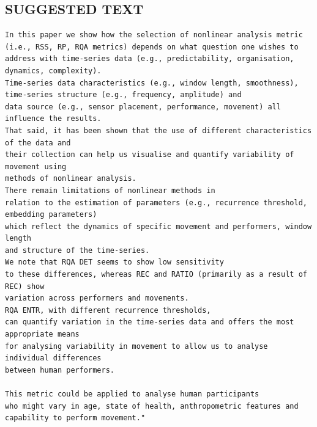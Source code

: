 \documentclass[10pt]{article}
\begin{document}
\subsection{SUGGESTED TEXT}
\begin{verbatim}
In this paper we show how the selection of nonlinear analysis metric 
(i.e., RSS, RP, RQA metrics) depends on what question one wishes to 
address with time-series data (e.g., predictability, organisation, dynamics, complexity).  
Time-series data characteristics (e.g., window length, smoothness), 
time-series structure (e.g., frequency, amplitude) and 
data source (e.g., sensor placement, performance, movement) all influence the results. 
That said, it has been shown that the use of different characteristics of the data and 
their collection can help us visualise and quantify variability of movement using 
methods of nonlinear analysis.   
There remain limitations of nonlinear methods in 
relation to the estimation of parameters (e.g., recurrence threshold, embedding parameters) 
which reflect the dynamics of specific movement and performers, window length 
and structure of the time-series. 
We note that RQA DET seems to show low sensitivity 
to these differences, whereas REC and RATIO (primarily as a result of REC) show 
variation across performers and movements.   
RQA ENTR, with different recurrence thresholds, 
can quantify variation in the time-series data and offers the most appropriate means 
for analysing variability in movement to allow us to analyse individual differences 
between human performers.  

This metric could be applied to analyse human participants 
who might vary in age, state of health, anthropometric features and capability to perform movement."


\end{verbatim}
\end{document}
